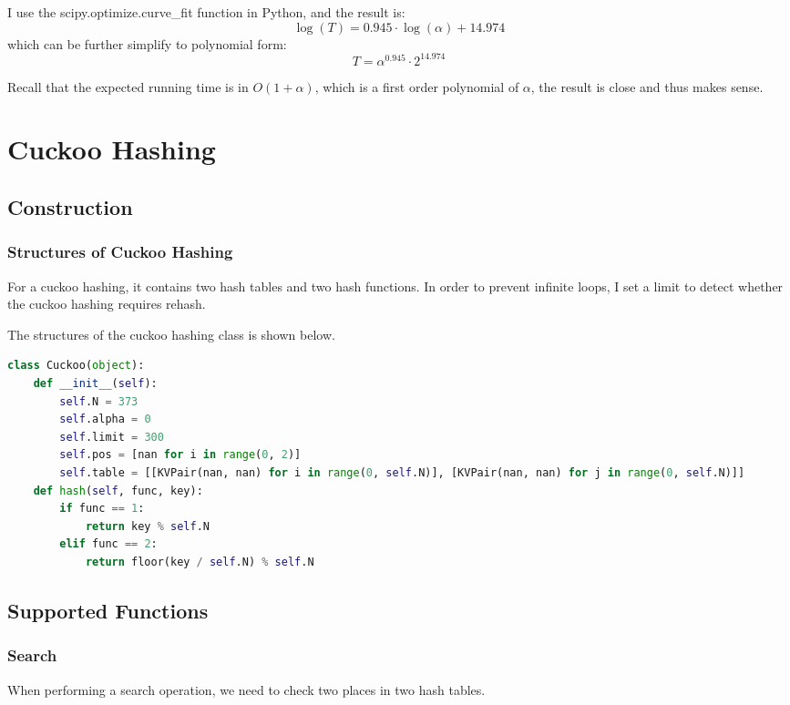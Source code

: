 \documentclass{article}
\begin{document}
\begin{spacing}{1.2}
\begin{itemize}
    I use the scipy.optimize.curve\_fit function in Python, and the result is:
    \begin{equation*}
        \log(T) = 0.945 \cdot \log(\alpha) + 14.974
    \end{equation*}
    which can be further simplify to polynomial form:
    \begin{equation*}
        T = \alpha^{0.945}\cdot 2^{14.974}
    \end{equation*}

    Recall that the expected running time is in $O(1+\alpha)$, which is a first order polynomial of $\alpha$, the result is close and thus makes sense.
\end{itemize}

\section{Cuckoo Hashing}
\subsection{Construction}
\subsubsection{Structures of Cuckoo Hashing}
For a cuckoo hashing, it contains two hash tables and two hash functions. In order to prevent infinite loops, I set a limit to detect whether the cuckoo hashing requires rehash.

The structures of the cuckoo hashing class is shown below.
\begin{lstlisting}[language=Python]
class Cuckoo(object):
    def __init__(self):
        self.N = 373
        self.alpha = 0
        self.limit = 300
        self.pos = [nan for i in range(0, 2)]
        self.table = [[KVPair(nan, nan) for i in range(0, self.N)], [KVPair(nan, nan) for j in range(0, self.N)]]
    def hash(self, func, key):
        if func == 1:
            return key % self.N
        elif func == 2:
            return floor(key / self.N) % self.N
\end{lstlisting}

\subsection{Supported Functions}
\subsubsection{Search}
When performing a search operation, we need to check two places in two hash tables.


\end{spacing}
\end{document}
